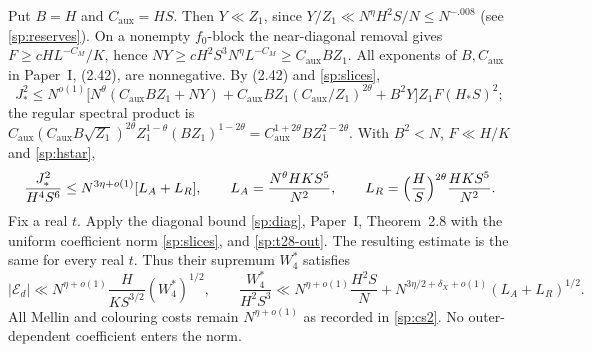 Put $B=H$ and $C_{\mathrm{aux}}=HS$. Then $Y\ll Z_1$, since
$Y/Z_1\ll N^\eta H^2S/N\le N^{-.008}$ (see \eqref{sp:reserves}). On a
nonempty $f_0$-block the near-diagonal removal gives $F\ge cHL^{-C_M}/K$,
hence $NY\ge cH^2S^3N^\eta L^{-C_M}\ge C_{\mathrm{aux}}BZ_1$. All exponents of $B,C_{\mathrm{aux}}$
in Paper~I, (2.42), are nonnegative. By (2.42) and \eqref{sp:slices},
\[
 J_*^2\le N^{o(1)}\bigl[N^\theta(C_{\mathrm{aux}}BZ_1+NY)+C_{\mathrm{aux}}BZ_1(C_{\mathrm{aux}}/Z_1)^{2\theta}+B^2Y\bigr]
 Z_1F(H_*S)^2;
\]
the regular spectral product is
$C_{\mathrm{aux}}(C_{\mathrm{aux}}B\sqrt{Z_1})^{2\theta}Z_1^{1-\theta}(BZ_1)^{1-2\theta}=C_{\mathrm{aux}}^{1+2\theta}BZ_1^{2-2\theta}$.
With $B^2<N$, $F\ll H/K$ and \eqref{sp:hstar},
\begin{equation}\label{sp:t28-out}
 \frac{J_*^2}{H^4S^6}\le N^{3\eta+o(1)}[L_A+L_R],\qquad
 L_A=\frac{N^\theta HKS^5}{N^2},\qquad
 L_R=\Bigl(\frac HS\Bigr)^{2\theta}\frac{HKS^5}{N^2}.
\end{equation}
Fix a real $t$. Apply the diagonal bound \eqref{sp:diag}, Paper~I,
Theorem~2.8 with the uniform coefficient norm \eqref{sp:slices}, and
\eqref{sp:t28-out}. The resulting estimate is the same for every real $t$. Thus their supremum $W_4^*$ satisfies
\begin{equation}\label{sp:Ed}
 |\mathcal E_d|\ll N^{\eta+o(1)}\frac H{KS^{3/2}}(W_4^*)^{1/2},\qquad
 \frac{W_4^*}{H^2S^3}\ll
 N^{\eta+o(1)}\frac{H^2S}N+
 N^{3\eta/2+\delta_X+o(1)}(L_A+L_R)^{1/2}.
\end{equation}
All Mellin and colouring costs remain $N^{\eta+o(1)}$ as recorded
in \eqref{sp:cs2}. No outer-dependent coefficient enters the norm.

